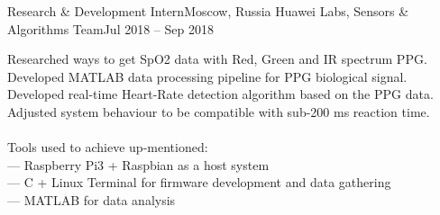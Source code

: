 \resumeSubheading
    {Research \& Development Intern}{Moscow, Russia}
    {Huawei Labs, Sensors \& Algorithms Team}{Jul 2018 -- Sep 2018}
    \begin{itemize}[leftmargin=0in, label={}]
        \small{\item{
            {Researched ways to get SpO2 data with Red, Green and IR spectrum PPG.}\\
            {Developed MATLAB data processing pipeline for PPG biological signal.}\\
            {Developed real-time Heart-Rate detection algorithm based on the PPG data.}\\
            {Adjusted system behaviour to be compatible with sub-200 ms reaction time. }\\
            {\ }\\
            {Tools used to achieve up-mentioned:}\\
            {— Raspberry Pi3 + Raspbian as a host system }\\
            {— C + Linux Terminal for firmware development and data gathering}\\
            {— MATLAB for data analysis}\\
        }}
    \end{itemize}
